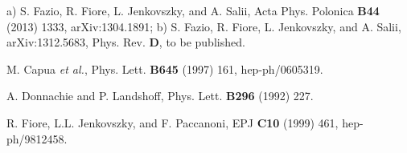 \documentclass[12pt]{article}
\begin{document}
\begin{thebibliography}{99}
 a) S. Fazio, R. Fiore, L. Jenkovszky, and A. Salii, Acta Phys. Polonica {\bf B44} (2013) 1333, arXiv:1304.1891; b) S. Fazio, R. Fiore, L. Jenkovszky, and A. Salii, 
arXiv:1312.5683, Phys. Rev. {\bf D}, to be published. 

 M. Capua {\it et al.}, Phys. Lett. {\bf B645} (1997) 161, hep-ph/0605319.



 A. Donnachie and P. Landshoff, Phys. Lett. {\bf B296} (1992) 227.

 R. Fiore, L.L. Jenkovszky, and F. Paccanoni, EPJ {\bf C10} (1999) 461, hep-ph/9812458.




\end{thebibliography}
\end{document}
